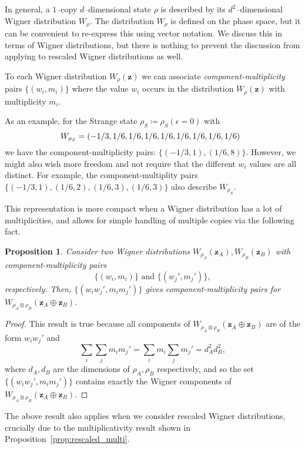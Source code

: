 \documentclass[
twocolumn,
superscriptaddress
]{revtex4-1}
\newtheorem{proposition}[theorem]{Proposition}
\def\z{\boldsymbol{z}}
\begin{document}
In general, a $1$--copy $d$--dimensional state $\rho$ is described by its $d^2$--dimensional Wigner distribution $W_\rho$. 
The distribution $W_\rho$ is defined on the phase space, but it can be convenient to re-express this using vector notation.
We discuss this in terms of Wigner distributions, but there is nothing to prevent the discussion from applying to rescaled Wigner distributions as well.

To each Wigner distribution $W_\rho(\z)$ we can associate \emph{component-multiplicity} pairs $\{(w_i, m_i)\}$ where the value $w_i$ occurs in the distribution $W_\rho(\z)$ with multiplicity $m_i$.

As an example, for the Strange state $\rho_S \coloneqq \rho_S(\epsilon=0)$ with
\begin{equation}
\hspace{-5pt} W_{\rho_S} = (-1/3, 1/6,  1/6,  1/6,  1/6,  1/6,  1/6,  1/6,  1/6)
\end{equation}
we have the component-multiplicity pairs: $\{( -1/3, 1), ( 1/6, 8)\}$. However, we might also wish more freedom and not require that the different $w_i$ values are all distinct. For example, the component-multiplity pairs $\{(-1/3, 1), (1/6, 2), (1/6, 3), (1/6, 3)\}$ also describe $W_{\rho_S}$.

This representation is more compact when a Wigner distribution has a lot of multiplicities, and allows for simple handling of multiple copies via the following fact.
\begin{proposition}
Consider two Wigner distributions $W_{\rho_A}(\z_A), W_{\rho_B}(\z_B)$ with component-multiplicity pairs 
\begin{equation}
	\{(w_i, m_i)\} \text{ and } \{(w_j', m_j')\},
\end{equation}
respectively. Then, $\{(w_i w_j', m_i m_j')\}$ gives component-multiplicity pairs for $W_{\rho_A \otimes \rho_B}(\z_A \oplus \z_B)$.
\end{proposition}
\begin{proof}
	This result is true because all components of $W_{\rho_A \otimes \rho_B}(\z_A \oplus \z_B)$ are of the form $w_i w_j'$ and 
\begin{equation*}
	\sum_{i}\sum_{j} m_i m_j' = \sum_{i} m_i \sum_{j} m_j' = d_A^2 d_B^2,
\end{equation*}
where $d_A, d_B$ are the dimensions of $\rho_A, \rho_B$ respectively, and
so the set $\{(w_i w_j', m_i m_j')\}$ contains exactly the Wigner components of $W_{\rho_A \otimes \rho_B}(\z_A \oplus \z_B)$.
\end{proof}
The above result also applies when we consider rescaled Wigner distributions, crucially due to the multiplicativity result shown in Proposition~\ref{prop:rescaled_multi}.
\end{document}
